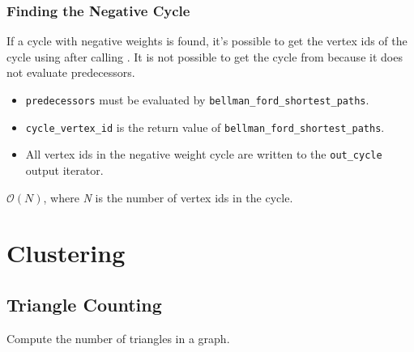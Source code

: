 {\small
      
}

\subsubsection{Finding the Negative Cycle}
If a cycle with negative weights is found, it's possible to get the vertex ids of the cycle
using  after calling . It is
not possible to get the cycle from  because it does
not evaluate predecessors.

{\small
      
}
\begin{itemdescr}
      \pnum\preconditions
            \begin{itemize}
                  \item \lstinline{predecessors} must be evaluated by \lstinline{bellman_ford_shortest_paths}.
                  \item \lstinline{cycle_vertex_id} is the return value of \lstinline{bellman_ford_shortest_paths}.
            \end{itemize}
      \pnum\effects
            \begin{itemize}
                  \item
                        All vertex ids in the negative weight cycle are written to the \lstinline{out_cycle} output
                        iterator.
            \end{itemize}
      \pnum\complexity  $\mathcal{O}(N)$, where \textit{N} is the number of vertex ids in the cycle. \\
\end{itemdescr}

\section{Clustering}
\subsection{Triangle Counting}
Compute the number of triangles in a graph.


